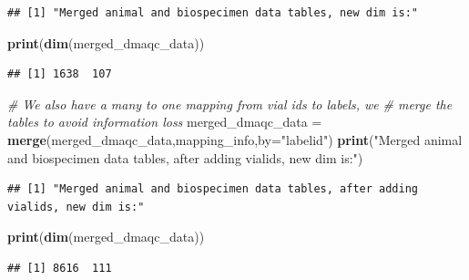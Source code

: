 \documentclass[]{article}
\newenvironment{Shaded}{\begin{snugshade}}{\end{snugshade}}
\newcommand{\KeywordTok}[1]{\textcolor[rgb]{0.13,0.29,0.53}{\textbf{#1}}}
\newcommand{\DataTypeTok}[1]{\textcolor[rgb]{0.13,0.29,0.53}{#1}}
\newcommand{\StringTok}[1]{\textcolor[rgb]{0.31,0.60,0.02}{#1}}
\newcommand{\CommentTok}[1]{\textcolor[rgb]{0.56,0.35,0.01}{\textit{#1}}}
\newcommand{\OperatorTok}[1]{\textcolor[rgb]{0.81,0.36,0.00}{\textbf{#1}}}
\newcommand{\NormalTok}[1]{#1}
\begin{document}
\begin{verbatim}
## [1] "Merged animal and biospecimen data tables, new dim is:"
\end{verbatim}

\begin{Shaded}
\begin{Highlighting}[]
\KeywordTok{print}\NormalTok{(}\KeywordTok{dim}\NormalTok{(merged_dmaqc_data))}
\end{Highlighting}
\end{Shaded}

\begin{verbatim}
## [1] 1638  107
\end{verbatim}

\begin{Shaded}
\begin{Highlighting}[]
\CommentTok{# We also have a many to one mapping from vial ids to labels, we }
\CommentTok{# merge the tables to avoid information loss}
\NormalTok{merged_dmaqc_data =}\StringTok{ }\KeywordTok{merge}\NormalTok{(merged_dmaqc_data,mapping_info,}\DataTypeTok{by=}\StringTok{"labelid"}\NormalTok{)}
\KeywordTok{print}\NormalTok{(}\StringTok{"Merged animal and biospecimen data tables, after adding vialids, new dim is:"}\NormalTok{)}
\end{Highlighting}
\end{Shaded}

\begin{verbatim}
## [1] "Merged animal and biospecimen data tables, after adding vialids, new dim is:"
\end{verbatim}

\begin{Shaded}
\begin{Highlighting}[]
\KeywordTok{print}\NormalTok{(}\KeywordTok{dim}\NormalTok{(merged_dmaqc_data))}
\end{Highlighting}
\end{Shaded}

\begin{verbatim}
## [1] 8616  111
\end{verbatim}

\begin{Shaded}
\end{Shaded}
\end{document}

